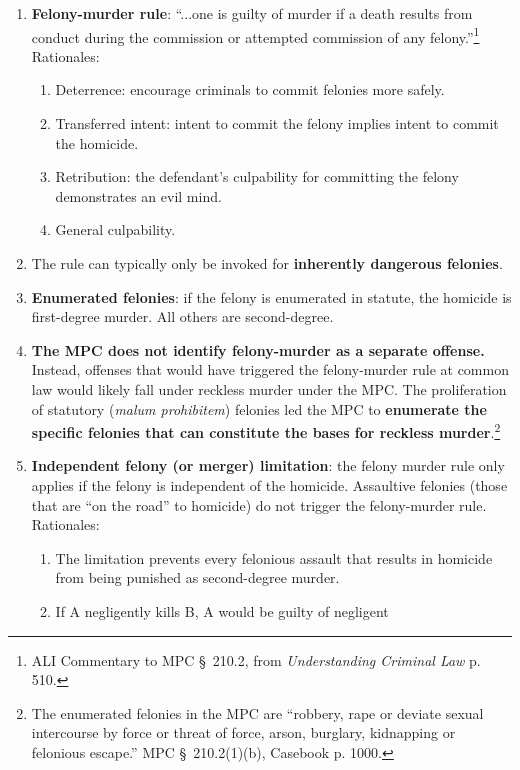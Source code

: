 \begin{enumerate}
    \item \textbf{Felony-murder rule}: ``...one is guilty of murder if a death results from conduct during 
    the commission or attempted commission of any felony.''\footnote{ALI 
    Commentary to MPC \S\ 210.2, from \emph{Understanding Criminal Law} p. 
    510.} Rationales:
    \begin{enumerate}
        \item Deterrence: encourage criminals to commit felonies more safely.
        \item Transferred intent: intent to commit the felony implies intent 
        to commit the homicide.
        \item Retribution: the defendant's culpability for committing the 
        felony demonstrates an evil mind.
        \item General culpability.
    \end{enumerate}
    \item The rule can typically only be invoked for \textbf{inherently dangerous 
    felonies}.
    \item \textbf{Enumerated felonies}: if the felony is enumerated in 
    statute, the homicide is first-degree murder. All others are 
    second-degree.
    \item \textbf{The MPC does not identify felony-murder as a separate 
    offense.} Instead, offenses that would have triggered the felony-murder 
    rule at common law would likely fall under reckless murder under the MPC. 
    The proliferation of statutory (\emph{malum prohibitem}) felonies led the 
    MPC to \textbf{enumerate the specific felonies that can constitute the bases for 
    reckless murder}.\footnote{The enumerated felonies in the MPC are ``robbery, 
    rape or deviate sexual intercourse by force or threat of force, arson, 
    burglary, kidnapping or felonious escape.'' MPC \S\ 210.2(1)(b), Casebook 
    p. 1000.}
    \item \textbf{Independent felony (or merger) limitation}: the felony 
    murder rule only applies if the felony is independent of the homicide. 
    Assaultive felonies (those that are ``on the road'' to homicide) do not 
    trigger the felony-murder rule. Rationales:
    \begin{enumerate}
        \item The limitation prevents every felonious assault that results in 
        homicide from being punished as second-degree murder.
        \item If A negligently kills B, A would be guilty of negligent 

\end{enumerate}
\end{enumerate}
